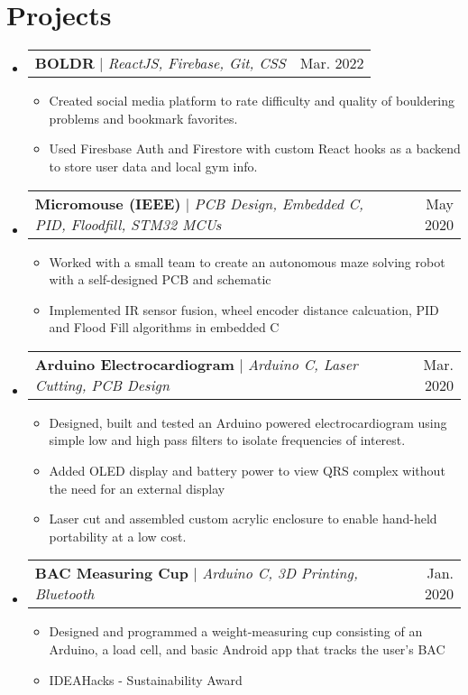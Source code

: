 \documentclass[letterpaper,11pt]{article}
\makeatletter
\newcommand{\resumeItem}[1]{
  \item\small{
    {#1 \vspace{-2pt}}
  }
}
\newcommand{\resumeProjectHeading}[2]{
    \item
    \begin{tabular*}{0.97\textwidth}{l@{\extracolsep{\fill}}r}
      \small#1 & #2 \\
    \end{tabular*}\vspace{-7pt}
}
\newcommand{\resumeSubHeadingListStart}{\begin{itemize}[leftmargin=0.15in, label={}]}
\newcommand{\resumeSubHeadingListEnd}{\end{itemize}}
\newcommand{\resumeItemListStart}{\begin{itemize}}
\newcommand{\resumeItemListEnd}{\end{itemize}\vspace{-5pt}}
\makeatother
\begin{document}
\section{Projects}
    \resumeSubHeadingListStart
      \resumeProjectHeading
      {\textbf{BOLDR} $|$ \emph{ReactJS, Firebase, Git, CSS}}{Mar. 2022}
      \resumeItemListStart
        \resumeItem{
          Created social media platform to rate difficulty and quality of 
          bouldering problems and bookmark favorites. 
        }
        \resumeItem{
          Used Firesbase Auth and Firestore with custom React hooks as a backend 
          to store user data and local gym info.
        }
      \resumeItemListEnd
      \resumeProjectHeading
          {\textbf{Micromouse (IEEE)} $|$ \emph{PCB Design, Embedded C, PID, Floodfill, STM32 MCUs}}{May 2020}
          \resumeItemListStart
            \resumeItem{
              Worked with a small team to create an autonomous maze solving robot with a 
              self-designed PCB and schematic
            }
            \resumeItem{
              Implemented IR sensor fusion, wheel encoder distance calcuation, 
              PID and Flood Fill algorithms in embedded C
            }
          \resumeItemListEnd
        \resumeProjectHeading
          {\textbf{Arduino Electrocardiogram} $|$ \emph{Arduino C, Laser Cutting, PCB Design}}{Mar. 2020}
          \resumeItemListStart
            \resumeItem{
              Designed, built and tested an Arduino powered electrocardiogram 
              using simple low and high pass filters to isolate frequencies of 
              interest.
            }
            \resumeItem{
              Added OLED display and battery power to view QRS complex without 
              the need for an external display
            }
            \resumeItem{
              Laser cut and assembled custom acrylic enclosure to enable hand-held 
              portability at a low cost.
            }
          \resumeItemListEnd
      \resumeProjectHeading
          {\textbf{BAC Measuring Cup} $|$ \emph{Arduino C, 3D Printing, Bluetooth}}{Jan. 2020}
          \resumeItemListStart
            \resumeItem{
              Designed and programmed a weight-measuring cup consisting of an 
              Arduino, a load cell, and basic Android app that tracks the user's 
              BAC
            }
            \resumeItem{
              IDEAHacks - Sustainability Award
            }
          \resumeItemListEnd
    \resumeSubHeadingListEnd

\end{document}
